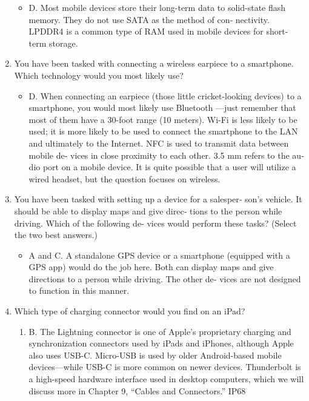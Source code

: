 \documentclass{article}
\begin{document}
\begin{enumerate}
    \begin{itemize}
        \item D. Most mobile devices store their long-term data to solid-state
flash memory. They do not use SATA as the method of con‐
nectivity. LPDDR4 is a common type of RAM used in mobile
devices for short-term storage.
    \end{itemize}
     \item You have been tasked with connecting a wireless earpiece to a
smartphone. Which technology would you most likely use?
    \begin{itemize}
        \item D. When connecting an earpiece (those little cricket-looking
devices) to a smartphone, you would most likely use Bluetooth
—just remember that most of them have a 30-foot range (10
meters). Wi-Fi is less likely to be used; it is more likely to be
used to connect the smartphone to the LAN and ultimately to
the Internet. NFC is used to transmit data between mobile de‐
vices in close proximity to each other. 3.5 mm refers to the au‐dio port on a mobile device. It is quite possible that a user will
utilize a wired headset, but the question focuses on wireless.
    \end{itemize}
    \item You have been tasked with setting up a device for a salesper‐
son’s vehicle. It should be able to display maps and give direc‐
tions to the person while driving. Which of the following de‐
vices would perform these tasks? (Select the two best answers.)
    \begin{itemize}
        \item A and C. A standalone GPS device or a smartphone (equipped
with a GPS app) would do the job here. Both can display maps
and give directions to a person while driving. The other de‐
vices are not designed to function in this manner.
    \end{itemize}
    \item Which type of charging connector would you find on an iPad?
    \begin{enumerate}
        \item B. The Lightning connector is one of Apple’s proprietary
charging and synchronization connectors used by iPads and
iPhones, although Apple also uses USB-C. Micro-USB is used
by older Android-based mobile devices—while USB-C is
more common on newer devices. Thunderbolt is a high-speed
hardware interface used in desktop computers, which we will
discuss more in Chapter 9, “Cables and Connectors.” IP68

\end{enumerate}
\end{enumerate}
\end{document}
